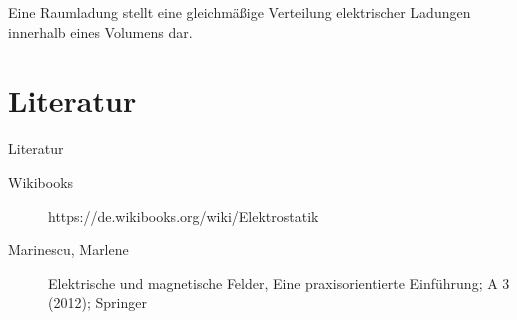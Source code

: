 \documentclass[aspectratio=169, ignorenonframetext]{beamer}
\begin{document}
Eine Raumladung stellt eine gleichmäßige Verteilung elektrischer Ladungen innerhalb eines Volumens dar.



\section{Literatur}
\begin{frame}{Literatur}
\begin{description}
 \item[Wikibooks] https://de.wikibooks.org/wiki/Elektrostatik
 \item[Marinescu, Marlene]  Elektrische und magnetische Felder,
 Eine praxisorientierte Einführung; A 3 (2012); Springer
\end{description}
\end{frame}


















\listoffigures


\label{LastPage}
\end{document}
